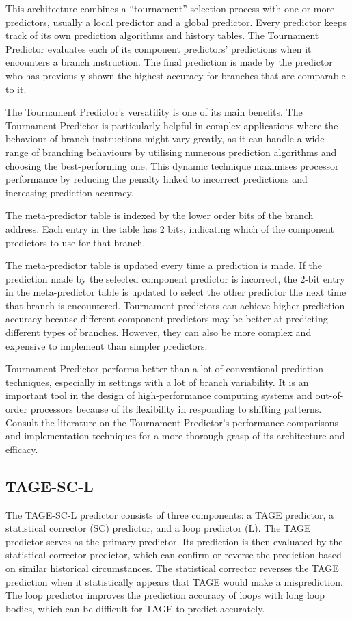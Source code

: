 \documentclass[10pt,journal,compsoc]{IEEEtran}
\begin{document}
This architecture combines a ``tournament'' selection process with one or more predictors, usually a local predictor and a global predictor. Every predictor keeps track of its own prediction algorithms and history tables. The Tournament Predictor evaluates each of its component predictors' predictions when it encounters a branch instruction. The final prediction is made by the predictor who has previously shown the highest accuracy for branches that are comparable to it.

The Tournament Predictor's versatility is one of its main benefits. The Tournament Predictor is particularly helpful in complex applications where the behaviour of branch instructions might vary greatly, as it can handle a wide range of branching behaviours by utilising numerous prediction algorithms and choosing the best-performing one. This dynamic technique maximises processor performance by reducing the penalty linked to incorrect predictions and increasing prediction accuracy.

The meta-predictor table is indexed by the lower order bits of the branch address. Each entry in the table has 2 bits, indicating which of the component predictors to use for that branch.

The meta-predictor table is updated every time a prediction is made. If the prediction made by the selected component predictor is incorrect, the 2-bit entry in the meta-predictor table is updated to select the other predictor the next time that branch is encountered.
Tournament predictors can achieve higher prediction accuracy because different component predictors may be better at predicting different types of branches. However, they can also be more complex and expensive to implement than simpler predictors.\cite{kothaComparativeStudyBranch}

Tournament Predictor performs better than a lot of conventional prediction techniques, especially in settings with a lot of branch variability. It is an important tool in the design of high-performance computing systems and out-of-order processors because of its flexibility in responding to shifting patterns. Consult the literature on the Tournament Predictor's performance comparisons and implementation techniques for a more thorough grasp of its architecture and efficacy.
\subsection{TAGE-SC-L}
\noindent
The TAGE-SC-L predictor consists of three components: a TAGE predictor, a statistical corrector (SC) predictor, and a loop predictor (L). The TAGE predictor serves as the primary predictor. Its prediction is then evaluated by the statistical corrector predictor, which can confirm or reverse the prediction based on similar historical circumstances. The statistical corrector reverses the TAGE prediction when it statistically appears that TAGE would make a misprediction. The loop predictor improves the prediction accuracy of loops with long loop bodies, which can be difficult for TAGE to predict accurately.\cite{seznecTAGESCBranchPredictors2014,seznecTAGESCBranchPredictorsAgain2016}
\end{document}
